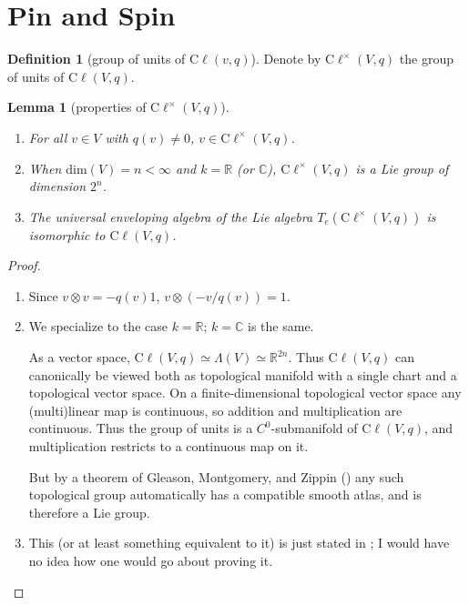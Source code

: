 \documentclass[a4paper]{report}
\newcommand{\R}{\mathbb{R}}
\newcommand{\C}{\mathbb{C}}
\newcommand{\defn}[1]{\ul{#1}}
\newcommand{\cliff}{\mathrm{C}\ell}
\theoremstyle{definition}
\newtheorem{definition}{Definition}[section]
\theoremstyle{plain}
\newtheorem{lemma}{Lemma}[section]
\theoremstyle{remark}
\begin{document}
\section{Pin and Spin}
\begin{definition}[group of units of $\cliff(v, q)$]
  \label{def:groupofunitsofcliff}
  Denote by \defn{$\cliff^{\times}(V, q)$} the group of units of $\cliff(V, q)$.
\end{definition}
\begin{lemma}[properties of $\cliff^{\times}(V, q)$]
  $\,$
  \begin{enumerate}
    \item For all $v \in V$ with $q(v) \neq 0$, $v \in \cliff^{\times}(V, q)$.

    \item When $\mathrm{dim}(V) = n < \infty$ and $k = \R$ (or $\C$), $\cliff^{\times}(V, q)$ is a Lie group of dimension $2^{n}$.

    \item The universal enveloping algebra of the Lie algebra $T_{e}(\cliff^{\times}(V, q))$ is isomorphic to $\cliff(V, q)$.
  \end{enumerate}
\end{lemma}
\begin{proof}
  $\,$
  \begin{enumerate}
    \item Since $v \otimes v = -q(v)1$, $v \otimes \left( -v/q(v) \right) = 1$.

    \item We specialize to the case $k = \R$; $k = \C$ is the same. 

      As a vector space, $\cliff(V, q) \simeq \Lambda(V) \simeq \R^{2n}$. Thus $\cliff(V, q)$ can canonically be viewed both as topological manifold with a single chart and a topological vector space. On a finite-dimensional topological vector space any (multi)linear map is continuous, so addition and multiplication are continuous. Thus the group of units is a $C^{0}$-submanifold of $\cliff(V, q)$, and multiplication restricts to a continuous map on it. 

      But by a theorem of Gleason, Montgomery, and Zippin (\cite{gleason-montgomery-zippin}) any such topological group automatically has a compatible smooth atlas, and is therefore a Lie group.

    \item This (or at least something equivalent to it) is just stated in \cite{michelson-lawson}; I would have no idea how one would go about proving it.
  \end{enumerate}
\end{proof}
\end{document}
